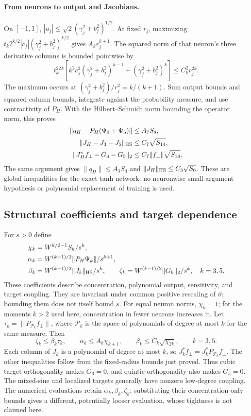 \paragraph{From neurons to output and Jacobians.}
On $[-1,1]$, $|u_j|\le\sqrt2(\gamma_j^2+b_j^2)^{1/2}$.
At fixed $r_j$, maximizing
$t_k2^{k/2}|c_j|(\gamma_j^2+b_j^2)^{k/2}$ gives $A_kr_j^{k+1}$.
The squared norm of that neuron's three derivative columns is bounded
pointwise by
\[
 t_k^22^k\left[k^2c_j^2(\gamma_j^2+b_j^2)^{k-1}
                    +(\gamma_j^2+b_j^2)^k\right]\le C_k^2r_j^{2k}.
\]
The maximum occurs at $(\gamma_j^2+b_j^2)/r_j^2=k/(k+1)$.
Sum output bounds and squared column bounds, integrate against the
probability measure, and use contractivity of $P_H$. With the
Hilbert--Schmidt norm bounding the operator norm, this proves
\begin{align}
 \|q_H-P_H(\Psi_3+\Psi_5)\|&\le A_7S_8,\notag\\
 \|J_H-J_3-J_5\|_{\rm HS}&\le C_7\sqrt{S_{14}},\notag\\
 \|J_H^*f_\perp-G_3-G_5\|_2&\le C_7\|f_\perp\|\sqrt{S_{14}}.
 \label{eq:feature-remainders}
\end{align}
The same argument gives $\|q_H\|\le A_3S_4$ and
$\|J_H\|_{\rm HS}\le C_3\sqrt{S_6}$.
These are global inequalities for the exact tanh network: no neuronwise
small-argument hypothesis or polynomial replacement of training is used.

\subsection{Structural coefficients and target dependence}
For $s>0$ define
\begin{align}
 \chi_k&=W^{k/2-1}S_k/s^k,\notag\\
 \alpha_k&=W^{(k-1)/2}\|P_H\Psi_k\|/s^{k+1},\notag\\
 \beta_k&=W^{(k-1)/2}\|J_k\|_{\rm HS}/s^k,\qquad
 \zeta_k=W^{(k-1)/2}\|G_k\|_2/s^k,\quad k=3,5.
 \label{eq:feature-shapes}
\end{align}
These coefficients describe concentration, polynomial output, sensitivity,
and target coupling. They are invariant under common positive rescaling
of $\vartheta$; bounding them does not itself bound $s$.
For equal neuron norms, $\chi_k=1$; for the moments $k>2$ used here,
concentration in fewer neurons increases it.
Let $\tau_k=\|P_{\mathcal P_k}f_\perp\|$, where $\mathcal P_k$ is the
space of polynomials of degree at most $k$ for the same measure. Then
\begin{equation}
 \zeta_k\le\beta_k\tau_k,\qquad
 \alpha_k\le A_k\chi_{k+1},\qquad
 \beta_k\le C_k\sqrt{\chi_{2k}},\qquad k=3,5.
 \label{eq:feature-target-loading}
\end{equation}
Each column of $J_k$ is a polynomial of degree at most $k$, so
$J_k^*f_\perp=J_k^*P_{\mathcal P_k}f_\perp$. The other inequalities
follow from the fixed-radius bounds just proved. Thus cubic target
orthogonality makes $G_3=0$, and quintic orthogonality also makes $G_5=0$.
The mixed-sine and localized targets generally have nonzero low-degree
coupling. The numerical evaluations retain $\alpha_k,\beta_k,\zeta_k$;
substituting their concentration-only bounds gives a different, potentially
looser evaluation, whose tightness is not claimed here.

